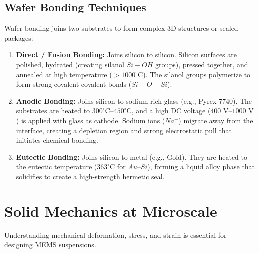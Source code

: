 \documentclass[12pt,a4paper]{article}
\begin{document}
\subsection{Wafer Bonding Techniques}
Wafer bonding joins two substrates to form complex 3D structures or sealed packages:
\begin{enumerate}[leftmargin=*, label=\arabic*., itemsep=3.5pt]
  \item \textbf{Direct / Fusion Bonding:} Joins silicon to silicon. Silicon surfaces are polished, hydrated (creating silanol $Si-OH$ groups), pressed together, and annealed at high temperature ($>1000^{\circ}\text{C}$). The silanol groups polymerize to form strong covalent covalent bonds ($Si-O-Si$).
  \item \textbf{Anodic Bonding:} Joins silicon to sodium-rich glass (e.g., Pyrex 7740). The substrates are heated to $300^{\circ}\text{C}$--$450^{\circ}\text{C}$, and a high DC voltage ($400\text{ V}$--$1000\text{ V}$) is applied with glass as cathode. Sodium ions ($Na^+$) migrate away from the interface, creating a depletion region and strong electrostatic pull that initiates chemical bonding.
  \item \textbf{Eutectic Bonding:} Joins silicon to metal (e.g., Gold). They are heated to the eutectic temperature ($363^{\circ}\text{C}$ for $Au$--$Si$), forming a liquid alloy phase that solidifies to create a high-strength hermetic seal.
\end{enumerate}

\section{Solid Mechanics at Microscale}

Understanding mechanical deformation, stress, and strain is essential for designing MEMS suspensions.
\end{document}
